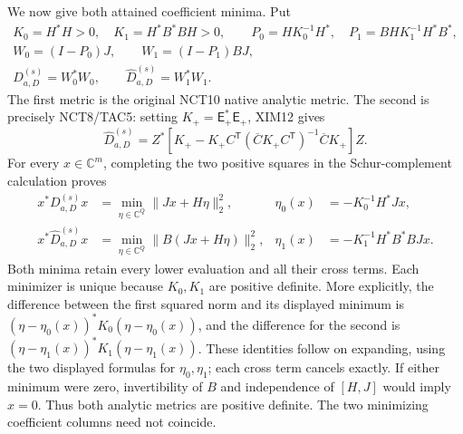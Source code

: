 \documentclass[11pt,a4paper]{article}
\begin{document}
We now give both attained coefficient minima. Put
\[
\begin{gathered}
 K_0=H^*H>0,\quad K_1=H^*B^*BH>0,\qquad
 P_0=HK_0^{-1}H^*,\quad P_1=BHK_1^{-1}H^*B^*,\\
 W_0=(I-P_0)J,\qquad W_1=(I-P_1)BJ,\\
 D_{a,D}^{(s)}=W_0^*W_0,\qquad
 \widehat D_{a,D}^{(s)}=W_1^*W_1.
\end{gathered}\tag{XIM14}
\]
The first metric is the original NCT10 native analytic metric. The
second is precisely NCT8/TAC5: setting $K_+=\mathsf E_+^*\mathsf E_+$,
XIM12 gives
\[
 \widehat D_{a,D}^{(s)}=
 Z^*\left[K_+-K_+C^{\mathsf T}
    (\overline C K_+ C^{\mathsf T})^{-1}\overline C K_+\right]Z.
 \tag{XIM15}
\]
For every $x\in\mathbb C^m$, completing the two positive squares
in the Schur-complement calculation
\cite[Appendix A.5.5, p.~650; Appendix C.4.1, p.~673]{human:boyd-vandenberghe}
proves
\[
\begin{aligned}
 x^*D_{a,D}^{(s)}x
   &=\min_{\eta\in\mathbb C^Q}\|Jx+H\eta\|_2^2,
 &\eta_0(x)&=-K_0^{-1}H^*Jx,\\
 x^*\widehat D_{a,D}^{(s)}x
   &=\min_{\eta\in\mathbb C^Q}\|B(Jx+H\eta)\|_2^2,
 &\eta_1(x)&=-K_1^{-1}H^*B^*BJx.
\end{aligned}\tag{XIM16}
\]
Both minima retain every lower evaluation and all their cross terms.
Each minimizer is unique because $K_0,K_1$ are positive definite.
More explicitly, the difference between the first squared norm and
its displayed minimum is
$(\eta-\eta_0(x))^*K_0(\eta-\eta_0(x))$, and the difference for
the second is $(\eta-\eta_1(x))^*K_1(\eta-\eta_1(x))$.
These identities follow on expanding, using the two displayed
formulas for $\eta_0,\eta_1$; each cross term cancels exactly.
If either minimum were zero, invertibility of $B$ and independence
of $[H,J]$ would imply $x=0$. Thus both analytic metrics are positive
definite. The two minimizing coefficient columns need not coincide.
\end{document}
